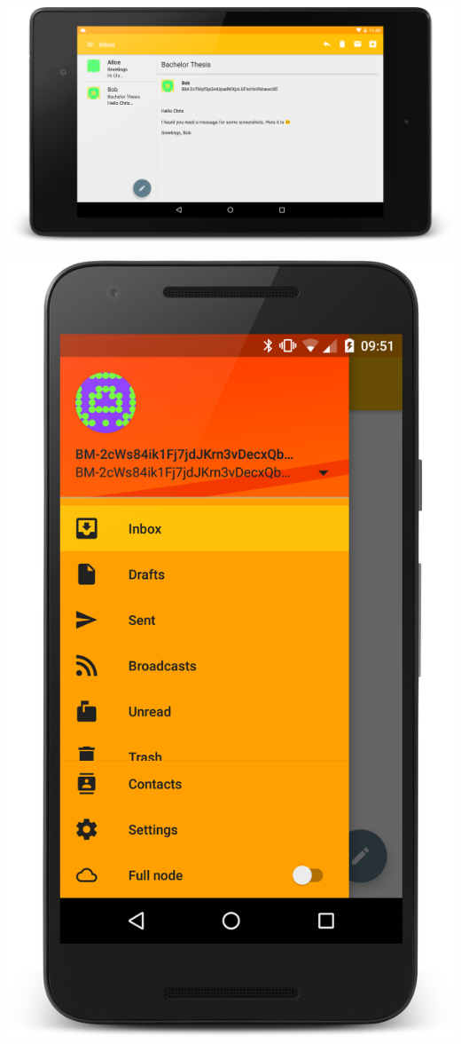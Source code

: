 \documentclass{bfh}
\begin{document}
  \begin{center}
    \begin{minipage}{.71\linewidth}
      \includegraphics[width=1.0 \textwidth]{images/screenshots/inbox_and_message_N7.png}
    \end{minipage}
    \hspace{.03\linewidth}
    \begin{minipage}{.24\linewidth}
      \includegraphics[width=1.0 \textwidth]{images/screenshots/drawer_menu.png}
    \end{minipage}
  \end{center}
\end{document}
